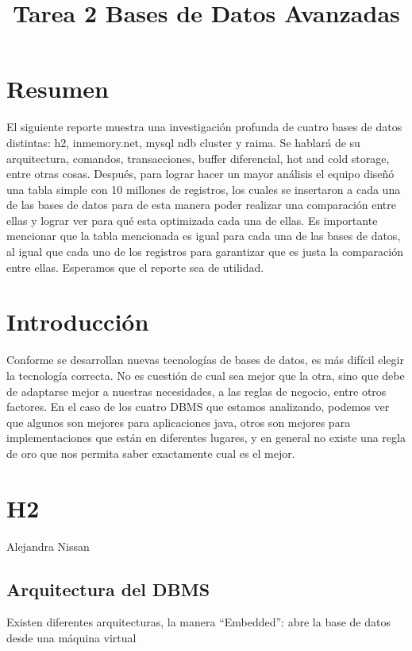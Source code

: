 \documentclass{acmart}
\title{Tarea 2 Bases de Datos Avanzadas}
\begin{document}
\maketitle

\tableofcontents

\section{Resumen}
El siguiente reporte muestra una investigación profunda de cuatro bases de datos distintas: h2, inmemory.net, mysql ndb cluster y raima. Se hablará de su arquitectura, comandos, transacciones, buffer diferencial, hot and cold storage, entre otras cosas. Después, para lograr hacer un mayor análisis el equipo diseñó una tabla simple con 10 millones de registros, los cuales se insertaron a cada una de las bases de datos para de esta manera poder realizar una comparación entre ellas y lograr ver para qué esta optimizada cada una de ellas. Es importante mencionar que la tabla mencionada es igual para cada una de las bases de datos, al igual que cada uno de los registros para garantizar que es justa la comparación entre ellas. Esperamos que el reporte sea de utilidad. 

\section{Introducción}
Conforme se desarrollan nuevas tecnologías de bases de datos, es más difícil elegir la tecnología correcta. No es cuestión de cual sea mejor que la otra, sino que debe de adaptarse mejor a nuestras necesidades, a las reglas de negocio, entre otros factores. En el caso de los cuatro DBMS que estamos analizando, podemos ver que algunos son mejores para aplicaciones java, otros son mejores para implementaciones que están en diferentes lugares, y  en general no existe una regla de oro que nos permita saber exactamente cual es el mejor.

\section{H2}

Alejandra Nissan 



\subsection{Arquitectura del DBMS}

Existen diferentes arquitecturas, la manera “Embedded”: abre la base de datos desde una máquina virtual
\end{document}

